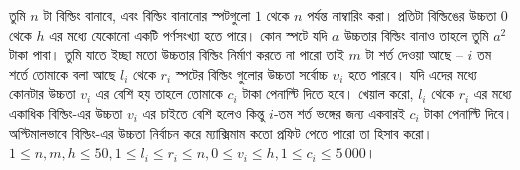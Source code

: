 \begin{example}
  তুমি $n$ টা বিল্ডিং বানাবে, এবং বিল্ডিং বানানোর স্পটগুলো $1$ থেকে $n$
  পর্যন্ত নাম্বারিং করা। প্রতিটা বিল্ডিঙের উচ্চতা 0 থেকে $h$ এর মধ্যে যেকোনো
  একটি পর্ণসংখ্যা হতে পারে। কোন স্পটে যদি $a$ উচ্চতার বিল্ডিং বানাও তাহলে
  তুমি $a^2$ টাকা পাবা। তুমি যাতে ইচ্ছা মতো উচ্চতার বিল্ডিং নির্মাণ করতে না
  পারো তাই $m$ টা শর্ত দেওয়া আছে -- $i$ তম শর্তে তোমাকে বলা আছে $l_i$ থেকে
  $r_i$ স্পটের বিল্ডিং গুলোর উচ্চতা সর্বোচ্চ $v_i$ হতে পারবে। যদি এদের মধ্যে
  কোনটার উচ্চতা $v_i$ এর বেশি হয় তাহলে তোমাকে $c_i$ টাকা পেনাল্টি দিতে হবে।
  খেয়াল করো, $l_i$ থেকে $r_i$ এর মধ্যে একাধিক বিল্ডিং-এর উচ্চতা $v_i$ এর
  চাইতে বেশি হলেও কিন্তু $i$-তম শর্ত ভঙ্গের জন্য একবারই $c_i$ টাকা পেনাল্টি
  দিবে। অপ্টিমালভাবে বিল্ডিং-এর উচ্চতা নির্বাচন করে ম্যাক্সিমাম কতো প্রফিট
  পেতে পারো তা হিসাব করো। $1 \le n, m, h \le 50, 1 \le l_i \le r_i \le n, 0
  \le v_i \le h, 1 \le c_i \le 5\,000$।
\end{example}
